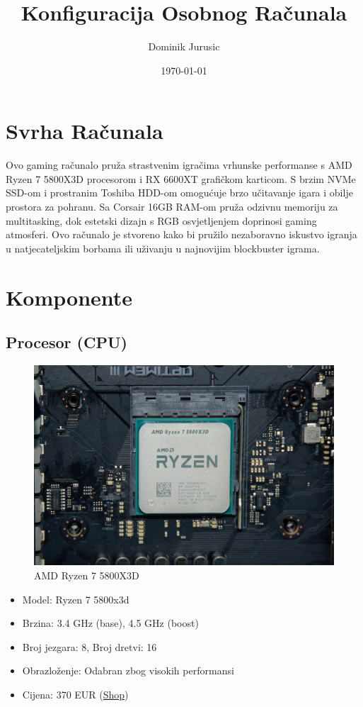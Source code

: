 \documentclass{article}
\title{Konfiguracija Osobnog Računala}
\author{Dominik Jurusic}
\date{\today}
\begin{document}
\maketitle
\tableofcontents
\listoffigures
\pagebreak



\section{Svrha Računala}
Ovo gaming računalo pruža strastvenim igračima vrhunske performanse s AMD Ryzen 7 5800X3D procesorom i RX 6600XT grafičkom karticom. S brzim NVMe SSD-om i prostranim Toshiba HDD-om omogućuje brzo učitavanje igara i obilje prostora za pohranu. Sa Corsair 16GB RAM-om pruža odzivnu memoriju za multitasking, dok estetski dizajn s RGB osvjetljenjem doprinosi gaming atmosferi. Ovo računalo je stvoreno kako bi pružilo nezaboravno iskustvo igranja u natjecateljskim borbama ili uživanju u najnovijim blockbuster igrama.

\section{Komponente}

\subsection{Procesor (CPU)}
\begin{figure}[H]
    \centering
    \includegraphics[width = \textwidth]{Slike/CPU.jpg}
    \caption{AMD Ryzen 7 5800X3D}
    \label{fig:Procesor}
\end{figure}
\begin{itemize}
    \item Model: Ryzen 7 5800x3d
    \item Brzina: 3.4 GHz (base), 4.5 GHz (boost)
    \item Broj jezgara: 8, Broj dretvi: 16
    \item Obrazloženje: Odabran zbog visokih performansi 
    \item Cijena: 370 EUR (\href{https://www.adm.hr/cpu-amd-ryzen-7-5800x3d-box-am4-100-100000651wof/72892/product/}{Shop})
\end{itemize}
\end{document}
